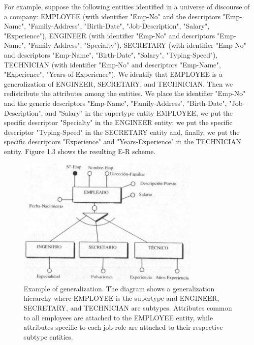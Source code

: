 \documentclass{article}
\begin{document}
For example, suppose the following entities identified in a universe of discourse of a company: EMPLOYEE (with identifier "Emp-No" and the descriptors "Emp-Name", "Family-Address", "Birth-Date", "Job-Description", "Salary", "Experience"), ENGINEER (with identifier "Emp-No" and descriptors "Emp-Name", "Family-Address", "Specialty"), SECRETARY (with identifier "Emp-No" and descriptors "Emp-Name", "Birth-Date", "Salary", "Typing-Speed"), TECHNICIAN (with identifier "Emp-No" and descriptors "Emp-Name", "Experience", "Years-of-Experience").  We identify that EMPLOYEE is a generalization of ENGINEER, SECRETARY, and TECHNICIAN.  Then we redistribute the attributes among the entities.  We place the identifier "Emp-No" and the generic descriptors "Emp-Name", "Family-Address", "Birth-Date", "Job-Description", and "Salary" in the supertype entity EMPLOYEE, we put the specific descriptor "Specialty" in the ENGINEER entity; we put the specific descriptor "Typing-Speed" in the SECRETARY entity and, finally, we put the specific descriptors "Experience" and "Years-Experience" in the TECHNICIAN entity.  Figure 1.3 shows the resulting E-R scheme.

\begin{figure}
    \centering
    \includegraphics[width=0.8\textwidth]{figures/fig3}
    \caption{Example of generalization. The diagram shows a generalization hierarchy where EMPLOYEE is the supertype and ENGINEER, SECRETARY, and TECHNICIAN are subtypes. Attributes common to all employees are attached to the EMPLOYEE entity, while attributes specific to each job role are attached to their respective subtype entities.}
    \label{fig:fig1.3}
\end{figure}
\end{document}
